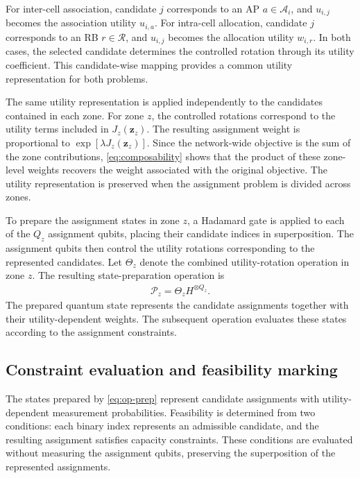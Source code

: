 \documentclass[journal]{IEEEtran}
\begin{document}
{{For inter-cell association, candidate $j$ corresponds to an AP $a\in\mathcal{A}_i$, and $u_{i,j}$ becomes the association utility
$u_{i,a}$. For intra-cell allocation, candidate $j$ corresponds to an RB $r\in\mathcal{R}$, and $u_{i,j}$ becomes the allocation utility
$w_{i,r}$. In both cases, the selected candidate determines the controlled rotation through its utility coefficient. This candidate-wise
mapping provides a common utility representation for both problems.

The same utility representation is applied independently to the candidates contained in each zone. For zone $z$, the controlled rotations correspond to the utility terms included in $J_z(\bm z_z)$. The resulting assignment weight is proportional to
$\exp\left[\lambda J_z(\bm z_z)\right]$.
Since the network-wide objective is the sum of the zone contributions, \eqref{eq:composability} shows that the product of these zone-level weights recovers the weight associated with the original objective. The utility representation is preserved when the assignment
problem is divided across zones.

To prepare the assignment states in zone $z$, a Hadamard gate is applied to each of the $Q_z$ assignment qubits, placing their candidate
indices in superposition. The assignment qubits then control the utility rotations corresponding to the represented candidates. Let
$\Theta_z$ denote the combined utility-rotation operation in zone $z$. The resulting state-preparation operation is
\begin{align}
\mathcal{P}_z=\Theta_z H^{\otimes Q_z}.
\label{eq:op-prep}
\end{align}
The prepared quantum state represents the candidate assignments together with their utility-dependent weights. The subsequent operation
evaluates these states according to the assignment constraints.

\vspace{-3mm}
\subsection{Constraint evaluation and feasibility marking}
\label{sec:oracle}
The states prepared by \eqref{eq:op-prep} represent candidate assignments with utility-dependent measurement probabilities. Feasibility is determined from two conditions: each binary index represents an admissible candidate, and the resulting assignment satisfies capacity constraints. These conditions are evaluated without measuring the assignment qubits, preserving the superposition of the represented assignments.

}}
\end{document}
